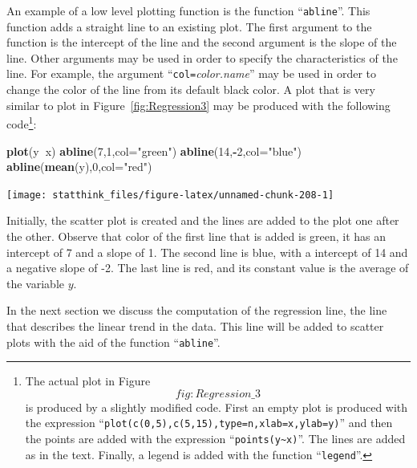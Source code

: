 \documentclass[
]{krantz}
\makeatletter
\newenvironment{Shaded}{\begin{snugshade}}{\end{snugshade}}
\newcommand{\DataTypeTok}[1]{\textcolor[rgb]{0.13,0.29,0.53}{#1}}
\newcommand{\DecValTok}[1]{\textcolor[rgb]{0.00,0.00,0.81}{#1}}
\newcommand{\KeywordTok}[1]{\textcolor[rgb]{0.13,0.29,0.53}{\textbf{#1}}}
\newcommand{\NormalTok}[1]{#1}
\newcommand{\OperatorTok}[1]{\textcolor[rgb]{0.81,0.36,0.00}{\textbf{#1}}}
\newcommand{\StringTok}[1]{\textcolor[rgb]{0.31,0.60,0.02}{#1}}
\newenvironment{kframe}{%
\medskip{}
\setlength{\fboxsep}{.8em}
 \def\at@end@of@kframe{}%
 \ifinner\ifhmode%
  \def\at@end@of@kframe{\end{minipage}}%
  \begin{minipage}{\columnwidth}%
 \fi\fi%
 \def\FrameCommand##1{\hskip\@totalleftmargin \hskip-\fboxsep
 \colorbox{shadecolor}{##1}\hskip-\fboxsep
     \hskip-\linewidth \hskip-\@totalleftmargin \hskip\columnwidth}%
 \MakeFramed {\advance\hsize-\width
   \@totalleftmargin\z@ \linewidth\hsize
   \@setminipage}}%
 {\par\unskip\endMakeFramed%
 \at@end@of@kframe}
\renewenvironment{Shaded}{\begin{kframe}}{\end{kframe}}
\theoremstyle{definition}
\theoremstyle{definition}
\theoremstyle{definition}
\theoremstyle{remark}
\makeatother
\begin{document}
An example of a low level plotting function is the function ``\texttt{abline}''.
This function adds a straight line to an existing plot. The first
argument to the function is the intercept of the line and the second
argument is the slope of the line. Other arguments may be used in order
to specify the characteristics of the line. For example, the argument
``\texttt{col=}\emph{color.name}'' may be used in order to change the color of the
line from its default black color. A plot that is very similar to plot
in Figure~\ref{fig:Regression3} may be produced with the following
code\footnote{The actual plot in Figure~\[fig:Regression\_3\] is produced by a
  slightly modified code. First an empty plot is produced with the
  expression ``\texttt{plot(c(0,5),c(5,15),type=n,xlab=x,ylab=y)}'' and then
  the points are added with the expression ``\texttt{points(y\textasciitilde{}x)}''. The lines
  are added as in the text. Finally, a legend is added with the
  function ``\texttt{legend}''.}:

\begin{Shaded}
\begin{Highlighting}[]
\KeywordTok{plot}\NormalTok{(y}\OperatorTok{~}\NormalTok{x)}
\KeywordTok{abline}\NormalTok{(}\DecValTok{7}\NormalTok{,}\DecValTok{1}\NormalTok{,}\DataTypeTok{col=}\StringTok{"green"}\NormalTok{)}
\KeywordTok{abline}\NormalTok{(}\DecValTok{14}\NormalTok{,}\OperatorTok{-}\DecValTok{2}\NormalTok{,}\DataTypeTok{col=}\StringTok{"blue"}\NormalTok{)}
\KeywordTok{abline}\NormalTok{(}\KeywordTok{mean}\NormalTok{(y),}\DecValTok{0}\NormalTok{,}\DataTypeTok{col=}\StringTok{"red"}\NormalTok{)}
\end{Highlighting}
\end{Shaded}

\begin{center}\texttt{[image: statthink\_files/figure-latex/unnamed-chunk-208-1]} \end{center}

Initially, the scatter plot is created and the lines are added to the
plot one after the other. Observe that color of the first line that is
added is green, it has an intercept of 7 and a slope of 1. The second
line is blue, with a intercept of 14 and a negative slope of -2. The
last line is red, and its constant value is the average of the variable
\(y\).

In the next section we discuss the computation of the regression line,
the line that describes the linear trend in the data. This line will be
added to scatter plots with the aid of the function ``\texttt{abline}''.
\end{document}
